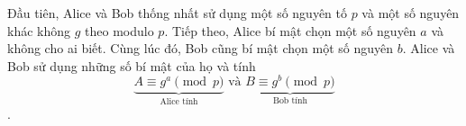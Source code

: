 
Đầu tiên, Alice và Bob thống nhất sử dụng một số nguyên tố $p$ và một số nguyên khác không $g$ theo modulo $p$. 
Tiếp theo, Alice bí mật chọn một số nguyên $a$ và không cho ai biết. Cùng lúc đó, Bob cũng bí mật chọn một số nguyên $b$.
Alice và Bob sử dụng những số bí mật của họ và tính
$$\underbrace{A \equiv g^a \pmod{p}}_{\text{Alice tính}} \text{ và } \underbrace{B \equiv g^b \pmod{p}}_{\text{Bob tính}}$$.

